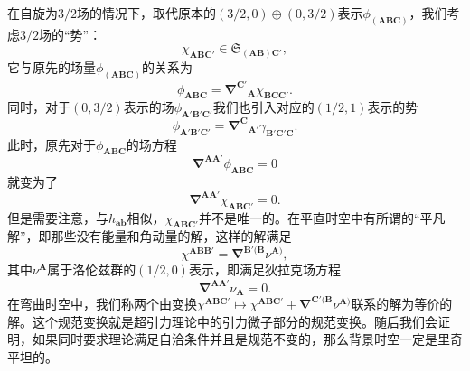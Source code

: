 在自旋为$3/2$场的情况下，取代原本的$( 3/2,0) \oplus ( 0,3/2)$表示$\phi _{(\boldsymbol{ABC})}$，我们考虑$3/2$场的“势”：
\begin{equation*}
	\chi _{\boldsymbol{ABC} '} \in \mathfrak{S}_{(\boldsymbol{AB} )\boldsymbol{C} '} ,
\end{equation*}
它与原先的场量$\phi _{(\boldsymbol{ABC})}$的关系为
\begin{equation}
	\phi _{\boldsymbol{ABC}} =\mathbf{\nabla }^{\boldsymbol{C} '}{}_{\boldsymbol{A}} \chi _{\boldsymbol{BCC} '} .
	\label{eq:7.23}
\end{equation}
同时，对于$( 0,3/2)$表示的场$\phi _{\boldsymbol{A} '\boldsymbol{B} '\boldsymbol{C} '}$我们也引入对应的$( 1/2,1)$表示的势
\begin{equation*}
	\phi _{\boldsymbol{A} '\boldsymbol{B} '\boldsymbol{C} '} =\mathbf{\nabla }^{\boldsymbol{C}}{}_{\boldsymbol{A} '} \gamma _{\boldsymbol{B} '\boldsymbol{C} '\boldsymbol{C}} .
\end{equation*}
此时，原先对于$\phi _{\boldsymbol{ABC}}$的场方程
\begin{equation}
	\mathbf{\nabla }^{\boldsymbol{AA} '} \phi _{\boldsymbol{ABC}} =0
	\label{eq:7.24}
\end{equation}
就变为了
\begin{equation}
	\mathbf{\nabla }^{\boldsymbol{AA} '} \chi _{\boldsymbol{ABC} '} =0.
	\label{eq:7.25}
\end{equation}
但是需要注意，与$h_{\boldsymbol{ab}}$相似，$\chi _{\boldsymbol{ABC} '}$并不是唯一的。在平直时空中有所谓的“平凡解”，即那些没有能量和角动量的解，这样的解满足\parencite{fierz1939relativistic,frauendiener_spin32_1995}
\begin{equation*}
	\chi ^{\boldsymbol{ABB} '} =\mathbf{\nabla }^{\boldsymbol{B} '(\boldsymbol{B}} \nu ^{\boldsymbol{A})} ,
\end{equation*}
其中$\nu ^{\boldsymbol{A}}$属于洛伦兹群的$( 1/2,0)$表示，即满足狄拉克场方程
\begin{equation*}
	\mathbf{\nabla }^{\boldsymbol{AA} '} \nu _{\boldsymbol{A}} =0.
\end{equation*}
在弯曲时空中，我们称两个由变换$\chi ^{\boldsymbol{ABC} '} \mapsto \chi ^{\boldsymbol{ABC} '} +\mathbf{\nabla }^{\boldsymbol{C} '(\boldsymbol{B}} \nu ^{\boldsymbol{A})}$联系的解为等价的解。这个规范变换就是超引力理论中的引力微子部分的规范变换。随后我们会证明，如果同时要求理论满足自洽条件并且是规范不变的，那么背景时空一定是里奇平坦的。



